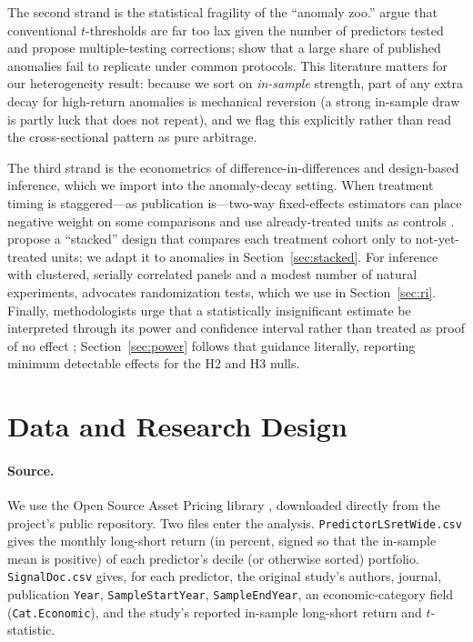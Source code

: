\documentclass[12pt]{article}
\begin{document}
The second strand is the statistical fragility of the ``anomaly zoo.'' \citet{harveyliuzhu2016}
argue that conventional $t$-thresholds are far too lax given the number of predictors tested and
propose multiple-testing corrections; \citet{houxuezhang2020} show that a large share of
published anomalies fail to replicate under common protocols. This literature matters for our
heterogeneity result: because we sort on \emph{in-sample} strength, part of any extra decay for
high-return anomalies is mechanical reversion (a strong in-sample draw is partly luck that does
not repeat), and we flag this explicitly rather than read the cross-sectional pattern as pure
arbitrage.

The third strand is the econometrics of difference-in-differences and design-based inference,
which we import into the anomaly-decay setting. When treatment timing is staggered---as
publication is---two-way fixed-effects estimators can place negative weight on some
comparisons and use already-treated units as controls
\citep{goodmanbacon2021,callaway2021}. \citet{cengiz2019} propose a ``stacked'' design that
compares each treatment cohort only to not-yet-treated units; we adapt it to anomalies in
Section~\ref{sec:stacked}. For inference with clustered, serially correlated panels and a
modest number of natural experiments, \citet{young2019} advocates randomization tests, which we
use in Section~\ref{sec:ri}. Finally, methodologists urge that a statistically insignificant
estimate be interpreted through its power and confidence interval rather than treated as proof
of no effect \citep{abadie2020,ioannidis2017}; Section~\ref{sec:power} follows that guidance
literally, reporting minimum detectable effects for the H2 and H3 nulls.

\section{Data and Research Design}\label{sec:data}
\paragraph{Source.} We use the Open Source Asset Pricing library
\citep{chenzimmermann2022}, downloaded directly from the project's public repository. Two files
enter the analysis. \texttt{PredictorLSretWide.csv} gives the monthly long-short return (in
percent, signed so that the in-sample mean is positive) of each predictor's decile (or
otherwise sorted) portfolio. \texttt{SignalDoc.csv} gives, for each predictor, the original
study's authors, journal, publication \texttt{Year}, \texttt{SampleStartYear},
\texttt{SampleEndYear}, an economic-category field (\texttt{Cat.Economic}), and the study's
reported in-sample long-short return and $t$-statistic.
\end{document}
